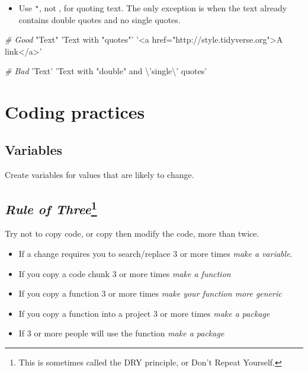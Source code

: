\documentclass[]{book}
\newenvironment{Shaded}{\begin{snugshade}}{\end{snugshade}}
\newcommand{\CharTok}[1]{\textcolor[rgb]{0.31,0.60,0.02}{#1}}
\newcommand{\CommentTok}[1]{\textcolor[rgb]{0.56,0.35,0.01}{\textit{#1}}}
\newcommand{\StringTok}[1]{\textcolor[rgb]{0.31,0.60,0.02}{#1}}
\providecommand{\tightlist}{%
  \setlength{\itemsep}{0pt}\setlength{\parskip}{0pt}}
\let\rmarkdownfootnote\footnote%
\def\footnote{\protect\rmarkdownfootnote}
\theoremstyle{definition}
\theoremstyle{definition}
\theoremstyle{definition}
\theoremstyle{remark}
\begin{document}
\begin{itemize}
\tightlist
\item
  Use \texttt{"}, not \texttt{\textquotesingle{}}, for quoting text. The
  only exception is when the text already contains double quotes and no
  single quotes.
\end{itemize}

\begin{Shaded}
\begin{Highlighting}[]
\CommentTok{# Good}
\StringTok{"Text"}
\StringTok{'Text with "quotes"'}
\StringTok{'<a href="http://style.tidyverse.org">A link</a>'}

\CommentTok{# Bad}
\StringTok{'Text'}
\StringTok{'Text with "double" and }\CharTok{\textbackslash{}'}\StringTok{single}\CharTok{\textbackslash{}'}\StringTok{ quotes'}
\end{Highlighting}
\end{Shaded}

\hypertarget{coding-practices}{%
\section{Coding practices}\label{coding-practices}}

\hypertarget{variables}{%
\subsection{Variables}\label{variables}}

Create variables for values that are likely to change.

\hypertarget{rule-of-threedry}{%
\subsection[\emph{Rule of Three}]{\texorpdfstring{\emph{Rule of
Three}\footnote{This is sometimes called the DRY principle, or Don't
  Repeat Yourself.}}{Rule of Three}}\label{rule-of-threedry}}

Try not to copy code, or copy then modify the code, more than twice.

\begin{itemize}
\tightlist
\item
  If a change requires you to search/replace 3 or more times \emph{make
  a variable}.
\item
  If you copy a code chunk 3 or more times \emph{make a function}
\item
  If you copy a function 3 or more times \emph{make your function more
  generic}
\item
  If you copy a function into a project 3 or more times \emph{make a
  package}
\item
  If 3 or more people will use the function \emph{make a package}
\end{itemize}
\end{document}
